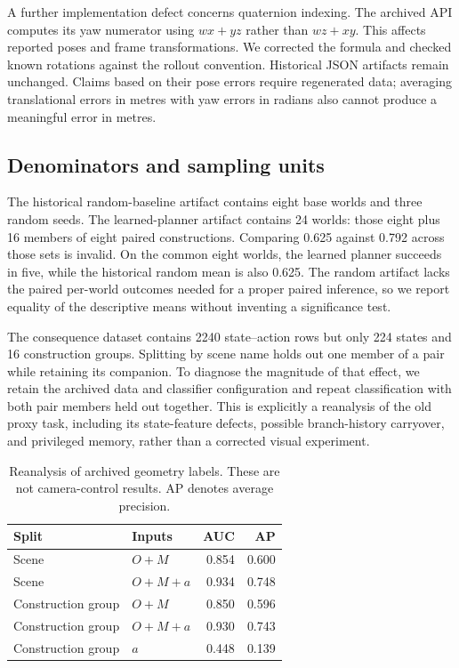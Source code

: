 \documentclass[10pt,twocolumn,a4paper]{article}
\begin{document}
A further implementation defect concerns quaternion indexing. The archived API computes its yaw numerator using $wx+yz$ rather than $wz+xy$. This affects reported poses and frame transformations. We corrected the formula and checked known rotations against the rollout convention. Historical JSON artifacts remain unchanged. Claims based on their pose errors require regenerated data; averaging translational errors in metres with yaw errors in radians also cannot produce a meaningful error in metres.

\subsection{Denominators and sampling units}
The historical random-baseline artifact contains eight base worlds and three random seeds. The learned-planner artifact contains 24 worlds: those eight plus 16 members of eight paired constructions. Comparing 0.625 against 0.792 across those sets is invalid. On the common eight worlds, the learned planner succeeds in five, while the historical random mean is also 0.625. The random artifact lacks the paired per-world outcomes needed for a proper paired inference, so we report equality of the descriptive means without inventing a significance test.

The consequence dataset contains 2240 state--action rows but only 224 states and 16 construction groups. Splitting by scene name holds out one member of a pair while retaining its companion. To diagnose the magnitude of that effect, we retain the archived data and classifier configuration and repeat classification with both pair members held out together. This is explicitly a reanalysis of the old proxy task, including its state-feature defects, possible branch-history carryover, and privileged memory, rather than a corrected visual experiment.

\begin{table}[t]
\centering\small
\caption{Reanalysis of archived geometry labels. These are not camera-control results. AP denotes average precision.}
\begin{tabular}{llrr}
\toprule Split & Inputs & AUC & AP\\\midrule
Scene & $O+M$ & 0.854 & 0.600\\
Scene & $O+M+a$ & 0.934 & 0.748\\
Construction group & $O+M$ & 0.850 & 0.596\\
Construction group & $O+M+a$ & 0.930 & 0.743\\
Construction group & $a$ & 0.448 & 0.139\\\bottomrule
\end{tabular}
\label{tab:legacy}
\end{table}
\end{document}
